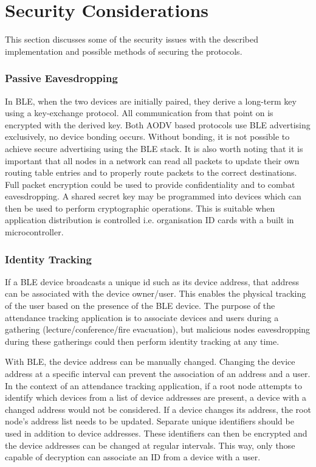     \section{Security Considerations}
    This section discusses some of the security issues with the described implementation
    and possible methods of securing the protocols.

      \subsubsection{Passive Eavesdropping}
    In BLE, when the two devices are initially paired, they derive a long-term key
    using a key-exchange protocol. All communication from that point on is encrypted
    with the derived key. Both AODV based protocols use BLE advertising exclusively,
    no device bonding occurs. Without bonding, it is not possible to achieve secure
    advertising using the BLE stack. It is also worth noting that it is important
    that all nodes in a network can read all packets to update their own routing table
    entries and to properly route packets to the correct destinations. Full packet
    encryption could be used to provide confidentiality and to combat eavesdropping.
    A shared secret key may be programmed into devices which can then be used to
    perform cryptographic operations. This is suitable when application distribution
    is controlled i.e. organisation ID cards with a built in microcontroller.

      \subsubsection{Identity Tracking}
    If a BLE device broadcasts a unique id such as its device address, that address
    can be associated with the device owner/user. This enables the physical tracking
    of the user based on the presence of the BLE device. The purpose of the attendance
    tracking application is to associate devices and users during a gathering
    (lecture/conference/fire evacuation), but malicious nodes eavesdropping during
    these gatherings could then perform identity tracking at any time.

    With BLE, the device address can be manually changed. Changing the device address
    at a specific interval can prevent the association of an address and a user. In
    the context of an attendance tracking application, if a root node attempts to
    identify which devices from a list of device addresses are present, a device
    with a changed address would not be considered. If a device changes its address,
    the root node’s address list needs to be updated.
    Separate unique identifiers should be used in addition to device addresses.
    These identifiers can then be encrypted and the device addresses can be changed
    at regular intervals. This way, only those capable of decryption can associate
    an ID from a device with a user.

